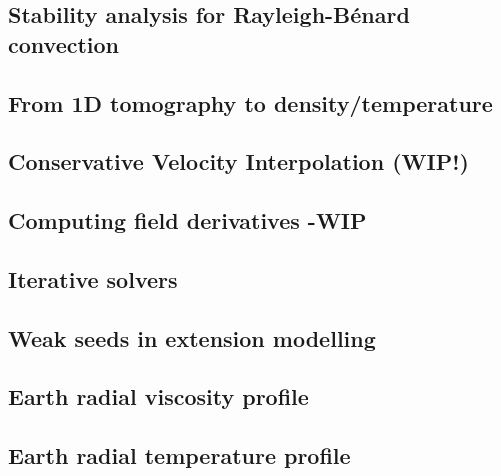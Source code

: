 \subsection{Stability analysis for Rayleigh-B\'enard convection} \label{ss:sarb}  %
\newpage %
\subsection{From 1D tomography to density/temperature}  %
\newpage %
\subsection{Conservative Velocity Interpolation (WIP!)} \label{sec:cvi} %
\newpage %
\subsection{Computing field derivatives -WIP} \label{ss:nodderiv}  %
\newpage %
\subsection{Iterative solvers \label{ss:itsolvers}}  %
\newpage %
\subsection{Weak seeds in extension modelling \label{ss:weakseeds}}  %
\newpage %
\subsection{Earth radial viscosity profile}  %
\newpage %
\subsection{Earth radial temperature profile \label{ss:adiab}}  %
\newpage %
